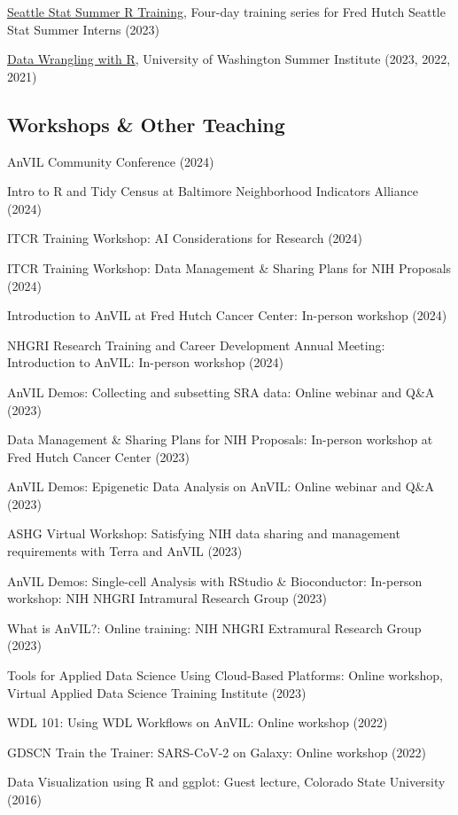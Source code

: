 \documentclass{cv}
\begin{document}
\href{https://hutchdatascience.org/SeattleStatSummer_R}{Seattle Stat Summer R Training}, Four-day training series for Fred Hutch Seattle Stat Summer Interns (2023)

\href{http://sisbid.github.io/Data-Wrangling/}{Data Wrangling with R}, University of Washington Summer Institute (2023, 2022, 2021)

\subsection*{Workshops \& Other Teaching}

AnVIL Community Conference (2024)

Intro to R and Tidy Census at Baltimore Neighborhood Indicators Alliance (2024)

ITCR Training Workshop: AI Considerations for Research (2024)

ITCR Training Workshop: Data Management \& Sharing Plans for NIH Proposals (2024)

Introduction to AnVIL at Fred Hutch Cancer Center: In-person workshop (2024)

NHGRI Research Training and Career Development Annual Meeting: Introduction to AnVIL: In-person workshop (2024)

AnVIL Demos: Collecting and subsetting SRA data: Online webinar and Q\&A (2023)

Data Management \& Sharing Plans for NIH Proposals: In-person workshop at Fred Hutch Cancer Center (2023)

AnVIL Demos: Epigenetic Data Analysis on AnVIL: Online webinar and Q\&A (2023)

ASHG Virtual Workshop: Satisfying NIH data sharing and management requirements with Terra and AnVIL (2023)

AnVIL Demos: Single-cell Analysis with RStudio \& Bioconductor: In-person workshop: NIH NHGRI Intramural Research Group (2023)

What is AnVIL?: Online training: NIH NHGRI Extramural Research Group (2023)

Tools for Applied Data Science Using Cloud-Based Platforms: Online workshop, Virtual Applied Data Science Training Institute (2023)

WDL 101: Using WDL Workflows on AnVIL: Online workshop (2022)

GDSCN Train the Trainer: SARS-CoV-2 on Galaxy: Online workshop (2022)

Data Visualization using R and ggplot: Guest lecture, Colorado State University (2016)
\end{document}

